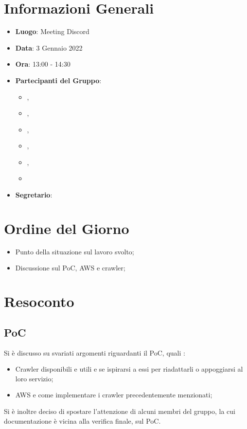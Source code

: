 \section{Informazioni Generali}

\begin{itemize}
\item{\textbf{Luogo}}: Meeting Discord
\item{\textbf{Data}}: 3 Gennaio 2022
\item{\textbf{Ora}}: 13:00 - 14:30
\item{\textbf{Partecipanti del Gruppo}}: 
	\begin{itemize}
	\item{\EP{},} 
	\item{\FP{},}
	\item{\GC{},}
	\item{\MB{},}
	\item{\MG{},}
	\item{\PV{}}
	\end{itemize} 
\item{\textbf{Segretario}}: \PV{}	
\end{itemize}

\section{Ordine del Giorno}
\begin{itemize}
\item{Punto della situazione sul lavoro svolto;}
\item{Discussione sul PoC, AWS e crawler;}


\end{itemize}

\section{Resoconto}

\subsection{PoC}
Si è discusso su svariati argomenti riguardanti il PoC, quali :  
\begin{itemize}
    \item Crawler disponibili e utili e se ispirarsi a essi per riadattarli o appoggiarsi al loro servizio;
    \item AWS e come implementare i crawler precedentemente menzionati;
\end{itemize}
Si è inoltre deciso di spostare l'attenzione di alcuni membri del gruppo, la cui documentazione è vicina alla verifica finale, sul PoC.

